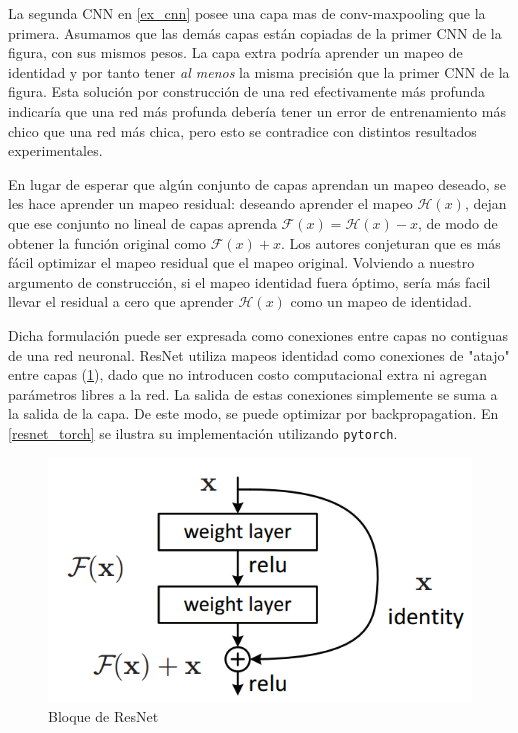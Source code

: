\documentclass[titlepage,a4paper,oneside]{article}
\begin{document}
La segunda CNN en \ref{ex_cnn} posee una capa mas de conv-maxpooling que la primera. Asumamos que las demás capas están copiadas de la primer CNN de la figura, con sus mismos pesos. La capa extra podría aprender un mapeo de identidad y por tanto tener \textit{al menos} la misma precisión que la primer CNN de la figura. Esta solución por construcción de una red efectivamente más profunda indicaría que una red más profunda debería tener un error de entrenamiento más chico que una red más chica, pero esto se contradice con distintos resultados experimentales.

En lugar de esperar que algún conjunto de capas aprendan un mapeo deseado, se les hace aprender un mapeo residual: deseando aprender el mapeo $\mathscr{H}(x)$, dejan que ese conjunto no lineal de capas aprenda $\mathscr{F}(x) = \mathscr{H}(x) - x$, de modo de obtener la función original como $\mathscr{F}(x) + x$. Los autores conjeturan que es más fácil optimizar el mapeo residual que el mapeo original. Volviendo a nuestro argumento de construcción, si el mapeo identidad fuera óptimo, sería más facil llevar el residual a cero que aprender $\mathscr{H}(x)$ como un mapeo de identidad.

Dicha formulación puede ser expresada como conexiones entre capas no contiguas de una red neuronal. ResNet utiliza mapeos identidad como conexiones de "atajo" entre capas (\ref{resnet_block}), dado que no introducen costo computacional extra ni agregan parámetros libres a la red. La salida de estas conexiones simplemente se suma a la salida de la capa. De este modo, se puede optimizar por backpropagation. En \ref{resnet_torch} se ilustra su implementación utilizando \texttt{pytorch}.

\begin{figure}[H]
\centering
\includegraphics[scale=0.5]{images/resnet_block.png}
\caption{Bloque de ResNet}
\label{resnet_block}
\end{figure}
\end{document}
